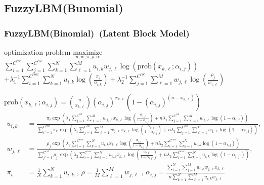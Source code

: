 \documentclass[fleqn,dvipdfmx,10pt]{beamer}
\begin{document}
\subsection{FuzzyLBM(Bunomial)}
\small
\begin{frame}\frametitle{FuzzyLBM(Binomial)~\small{(Latent Block Model)}}
  \begin{block}{optimization problem}
    $\underset{u,w,\pi,\rho,\alpha}{\text{maximize}}$
    $\sum_{i=1}^{C^{row}}\sum_{j=1}^{C^{col}}\sum_{k=1}^N\sum_{\ell=1}^Mu_{i,k}w_{j,\ell}\log\left(\text{prob}(x_{k,\ell};\alpha_{i,j})\right)$\\
    $+\lambda_{1}^{-1}\sum_{i=1}^{C^{row}}\sum_{k=1}^N u_{i,k}\log{(\frac{\pi_i}{u_{i,k}})}
    +\lambda_{2}^{-1}\sum_{j=1}^{C^{col}}\sum_{\ell=1}^M w_{j,\ell}\log{(\frac{\rho_{j}}{w_{i,\ell}})}$\centering\\
  \end{block}
  $\text{prob}(x_{k,\ell};\alpha_{i,j})=\binom{n}{x_{k,\ell}}(\alpha_{i,j})^{x_{k,\ell}}(1-(\alpha_{i,j})^{(n-x_{k,\ell})})$\centering
  \begin{align*}
    u_{i,k}&=\frac{\pi_i\exp\left(\lambda_1\sum_{j=1}^{C^{col}}\sum_{\ell=1}^M
      w_{j,\ell}x_{k,\ell}\log(\frac{\alpha_{i,j}}{1-\alpha_{i,j}})
      +n\lambda_1\sum_{j=1}^{C^{col}}\sum_{\ell=1}^M w_{j,\ell}\log(1-\alpha_{i,j})\right)}
    {\sum_{i'=1}^{C^{row}} \pi_{i'}\exp\left(\lambda_1\sum_{j=1}^{C^{col}}\sum_{\ell=1}^M
      w_{j,\ell}x_{k,\ell}\log(\frac{\alpha_{i',j}}{1-\alpha_{i',j}})
      +n\lambda_1\sum_{j=1}^{C^{col}}\sum_{\ell=1}^M w_{j,\ell}\log(1-\alpha_{i',j})\right)},\\
    w_{j,\ell}&=\frac{\rho_j\exp\left(\lambda_2\sum_{i=1}^{C^{row}}\sum_{k=1}^N u_{i,k}x_{k,\ell}\log(\frac{\alpha_{i,j}}{1-\alpha_{i,j}})
      +n\lambda_2\sum_{i=1}^{C^{row}}\sum_{k=1}^N u_{i,k}\log(1-\alpha_{i,j})\right)}
    {\sum_{j'=1}^{C^{col}} \rho_{j'}\exp\left(\lambda_2\sum_{i=1}^{C^{row}}\sum_{k=1}^N
      u_{i,k}x_{k,\ell}\log(\frac{\alpha_{i,j'}}{1-\alpha_{i,j'}})
      +n\lambda_2\sum_{i=1}^{C^{row}}\sum_{k=1}^N u_{i,k}\log(1-\alpha_{i,j'})\right)},\\
    \pi_i&=\frac{1}{N}\sum_{k=1}^Nu_{i,k}\text{ , }\rho=\frac{1}{M}\sum_{\ell=1}^Mw_{j,\ell}\text{ , }
    \alpha_{i,j}=\frac{\sum_{i=1}^N\sum_{j=1}^Mu_{i,k}w_{j,\ell}x_{k,\ell}}{n\sum_{k=1}^N\sum_{\ell=1}^Mu_{i,k}w_{j,\ell}}
  \end{align*}
\end{frame}
\end{document}
